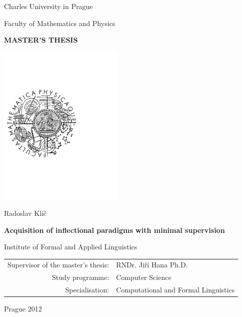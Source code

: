 
\pagestyle{empty}
\begin{center}

\large

Charles University in Prague

\medskip

Faculty of Mathematics and Physics

\vfill

{\bf\Large MASTER'S THESIS}

\vfill

\centerline{\hspace{18mm}\mbox{\includegraphics[width=60mm]{logo.pdf}}}

\vfill
\vspace{5mm}

{\LARGE Radoslav Klíč}

\vspace{15mm}

{\LARGE\bfseries Acquisition of inflectional paradigms with minimal supervision}

\vfill

Institute of Formal and Applied Linguistics

\vfill

\begin{tabular}{rl}

Supervisor of the master's thesis: & RNDr. Jiří Hana Ph.D.\\
\noalign{\vspace{2mm}}
Study programme: & Computer Science\\
\noalign{\vspace{2mm}}
Specialisation: & Computational and Formal Linguistics\\
\end{tabular}

\vfill

Prague 2012

\end{center}

